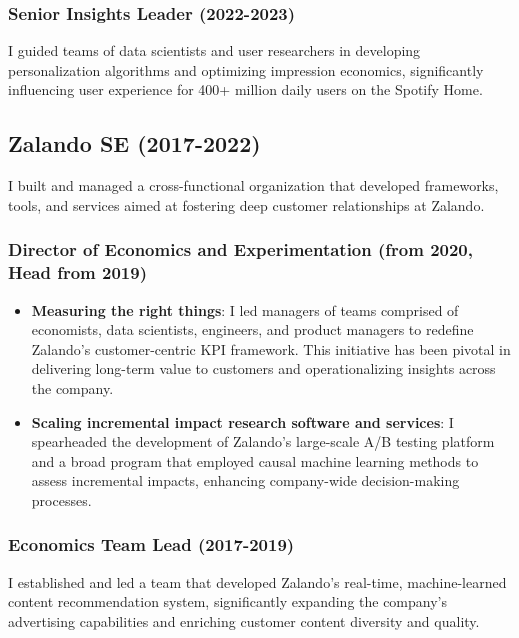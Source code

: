 \documentclass[a4paper]{article}
\begin{document}
\subsubsection*{Senior Insights Leader (2022-2023)}

I guided teams of data scientists and user researchers in developing personalization algorithms and optimizing impression economics, significantly influencing user experience for 400+ million daily users on the Spotify Home.

\subsection*{Zalando SE (2017-2022)}

I built and managed a cross-functional organization that developed frameworks, tools, and services aimed at fostering deep customer relationships at Zalando.

\subsubsection*{Director of Economics and Experimentation (from 2020, Head from 2019)}

\begin{itemize}
    \item \textbf{Measuring the right things}: I led managers of teams comprised of economists, data scientists, engineers, and product managers to redefine Zalando's customer-centric KPI framework. This initiative has been pivotal in delivering long-term value to customers and operationalizing insights across the company.
    \item \textbf{Scaling incremental impact research software and services}: I spearheaded the development of Zalando's large-scale A/B testing platform and a broad program that employed causal machine learning methods to assess incremental impacts, enhancing company-wide decision-making processes.
\end{itemize}

\subsubsection*{Economics Team Lead (2017-2019)}

I established and led a team that developed Zalando’s real-time, machine-learned content recommendation system, significantly expanding the company’s advertising capabilities and enriching customer content diversity and quality.
\end{document}
